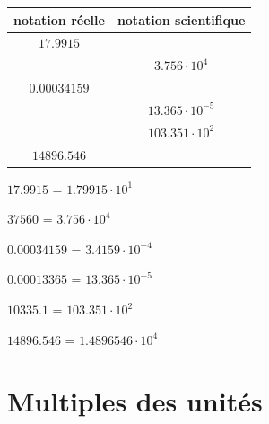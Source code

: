 \documentclass[
  11pt,
  a4paper,
  openany]{book}
\begin{document}
\begin{longtable}[]{@{}cc@{}}
\toprule()
notation réelle & notation scientifique \\
\midrule()
\endhead
\(17.9915\) & \\
& \(3.756 \cdot 10^{4}\) \\
\(0.00034159\) & \\
& \(13.365 \cdot 10^{-5}\) \\
& \(103.351 \cdot 10 ^{2}\) \\
\(14896.546\) & \\
\bottomrule()
\end{longtable}

\begin{Answer}
\(17.9915\) = \(1.79915 \cdot 10^{1}\)

\(37560\) = \(3.756 \cdot 10^{4}\)

\(0.00034159\) = \(3.4159 \cdot 10^{-4}\)

\(0.00013365\) = \(13.365 \cdot 10^{-5}\)

\(10335.1\) = \(103.351 \cdot 10 ^{2}\)

\(14896.546\) = \(1.4896546 \cdot 10^{4}\)

\end{Answer}

\hypertarget{multiples-des-unituxe9s}{%
\section{Multiples des unités}\label{multiples-des-unituxe9s}}
\end{document}
